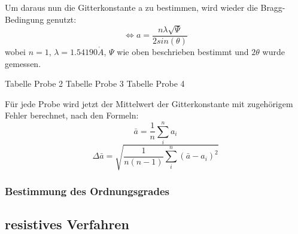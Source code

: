             Um daraus nun die Gitterkonstante a zu bestimmen, wird wieder die Bragg-Bedingung genutzt:
            \begin{equation}
                \Leftrightarrow a = \frac{n \lambda \sqrt{\Psi}}{2 sin(\theta)}
            \end{equation}
            wobei $n=1$, $\lambda = 1.54190 \mathring{A}$, $\Psi$ wie oben beschrieben bestimmt und $2 \theta$ wurde gemessen.

            Tabelle Probe 2
            Tabelle Probe 3
            Tabelle Probe 4

            Für jede Probe wird jetzt der Mittelwert der Gitterkonstante mit zugehörigem
            Fehler berechnet, nach den Formeln:
            \begin{equation}
                \bar{a} = \frac{1}{n} \sum^n_i a_i
            \end{equation}
            \begin{equation}
                \Delta \bar{a} = \sqrt{\frac{1}{n(n-1)} \sum^n_i (\bar{a}-a_i)^2}
            \end{equation}  

            \subsubsection{Bestimmung des Ordnungsgrades}

    \subsection{resistives Verfahren}
